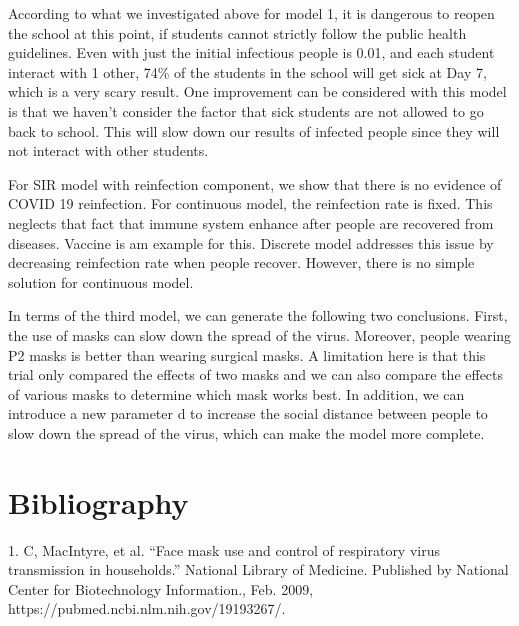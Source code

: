 \documentclass[11pt,a4paper]{article}
\begin{document}
\medskip \noindent
According to what we investigated above for model 1, it is dangerous to reopen the school at this point, if students cannot strictly follow the public health guidelines. Even with just the initial infectious people is 0.01, and each student interact with 1 other, 74\% of the students in the school will get sick at Day 7, which is a very scary result. One improvement can be considered with this model is that we haven't consider the factor that sick students are not allowed to go back to school. This will slow down our results of infected people since they will not interact with other students.


\medskip \noindent
For SIR model with reinfection component, we show that there is no evidence of COVID 19 reinfection. For continuous model, the reinfection rate is fixed. This neglects that fact that immune system enhance after people are recovered from diseases. Vaccine is am example for this. Discrete model addresses this issue by decreasing reinfection rate when people recover. However, there is no simple solution for continuous model. 

\medskip \noindent
In terms of the third model, we can generate the following two conclusions. First, the use of masks can slow down the spread of the virus. Moreover, people wearing P2 masks is better than wearing surgical masks. A limitation here is that this trial only compared the effects of two masks and we can also compare the effects of various masks to determine which mask works best. In addition, we can introduce a new parameter d to increase the social distance between people to slow down the spread of the virus, which can make the model more complete.







\newpage

\section*{Bibliography}

1. C, MacIntyre, et al. “Face mask use and control of respiratory virus transmission in households.” National Library of Medicine. Published by National Center for Biotechnology Information., 
Feb. 2009, https://pubmed.ncbi.nlm.nih.gov/19193267/. 
\end{document}
